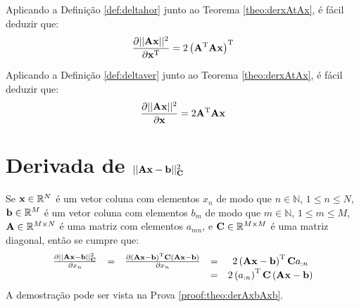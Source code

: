 \begin{corollaryT}\label{coro:derxAtAx1}
Aplicando a Definição \ref{def:deltahor} junto ao Teorema \ref{theo:derxAtAx}, é
fácil deduzir que:
\begin{equation}
\frac{\partial ||\MATRIX{A}\VECTOR{x}||^2 }{\partial \VECTOR{x}^{\transpose}}=
2\left(\MATRIX{A}^{\transpose}\MATRIX{A}\VECTOR{x}\right)^{\transpose}
\end{equation}
\end{corollaryT}

\begin{corollaryT}\label{coro:derxAtAx2}
Aplicando a Definição \ref{def:deltaver} junto ao Teorema \ref{theo:derxAtAx}, é
fácil deduzir que:
\begin{equation}
\frac{\partial ||\MATRIX{A}\VECTOR{x}||^2 }{\partial \VECTOR{x}}=
2 \MATRIX{A}^{\transpose}\MATRIX{A}\VECTOR{x}
\end{equation}
\end{corollaryT}

\section{Derivada de $||\MATRIX{A}\VECTOR{x}-\VECTOR{b}||_{\MATRIX{C}}^2$ 
}

\begin{theorem}\label{theo:derAxbAxb}
Se 
$\VECTOR{x}\in \mathbb{R}^N$ é um vetor coluna com elementos $x_n$ de modo que
$n\in \mathbb{N}$, $1 \leq n \leq N$, 
$\VECTOR{b}\in \mathbb{R}^M$ é um vetor coluna com elementos $b_m$ de modo que
$m\in \mathbb{N}$, $1 \leq m \leq M$,  
$\MATRIX{A} \in \mathbb{R}^{M\times N}$ é uma matriz com elementos $a_{mn}$, e
$\MATRIX{C} \in \mathbb{R}^{M\times M}$ é uma matriz diagonal, 
então se cumpre que:
\begin{equation}
\begin{matrix}
\frac{\partial ||\MATRIX{A}\VECTOR{x}-\VECTOR{b}||_{\MATRIX{C}}^2}{\partial x_n}&=&
\frac{\partial \left(\MATRIX{A}\VECTOR{x}-\VECTOR{b}\right)^{\transpose}\MATRIX{C}\left(\MATRIX{A}\VECTOR{x}-\VECTOR{b}\right)}{\partial x_n}&=&
2\left(\MATRIX{A}\VECTOR{x}-\VECTOR{b}\right)^{\transpose}\MATRIX{C}a_{:n}\\
~&~&~&=& 2\left(a_{:n}\right)^{\transpose}\MATRIX{C}\left(\MATRIX{A}\VECTOR{x}-  \VECTOR{b}\right)
\end{matrix}
\end{equation}
A demostração pode ser vista na Prova \ref{proof:theo:derAxbAxb}.
\end{theorem}


